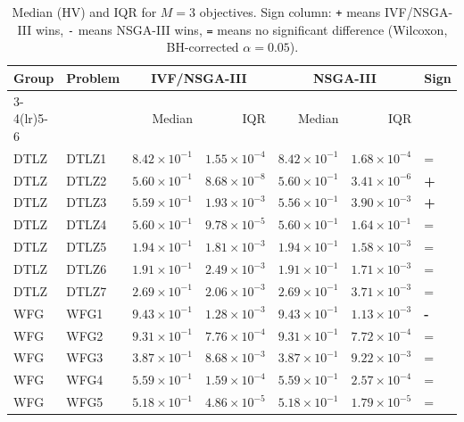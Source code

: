 \begin{table}[t]
\centering
\caption{Median (HV) and IQR for $M=3$ objectives. Sign column: \texttt{+} means IVF/NSGA-III wins, \texttt{-} means NSGA-III wins, \texttt{=} means no significant difference (Wilcoxon, BH-corrected $\alpha=0.05$).}
\label{tab:hv_m3_ivfnsgaiii}
\scriptsize
\begin{tabular}{llrrrrl}
\toprule
Group & Problem & \multicolumn{2}{c}{IVF/NSGA-III} & \multicolumn{2}{c}{NSGA-III} & Sign \\
\cmidrule(lr){3-4}\cmidrule(lr){5-6}
 & & Median & IQR & Median & IQR & \\
\midrule
DTLZ & DTLZ1 & $8.42\!\times\!10^{-1}$ & $1.55\!\times\!10^{-4}$ & $8.42\!\times\!10^{-1}$ & $1.68\!\times\!10^{-4}$ & = \\
DTLZ & DTLZ2 & $5.60\!\times\!10^{-1}$ & $8.68\!\times\!10^{-8}$ & $5.60\!\times\!10^{-1}$ & $3.41\!\times\!10^{-6}$ & \textbf{+} \\
DTLZ & DTLZ3 & $5.59\!\times\!10^{-1}$ & $1.93\!\times\!10^{-3}$ & $5.56\!\times\!10^{-1}$ & $3.90\!\times\!10^{-3}$ & \textbf{+} \\
DTLZ & DTLZ4 & $5.60\!\times\!10^{-1}$ & $9.78\!\times\!10^{-5}$ & $5.60\!\times\!10^{-1}$ & $1.64\!\times\!10^{-1}$ & = \\
DTLZ & DTLZ5 & $1.94\!\times\!10^{-1}$ & $1.81\!\times\!10^{-3}$ & $1.94\!\times\!10^{-1}$ & $1.58\!\times\!10^{-3}$ & = \\
DTLZ & DTLZ6 & $1.91\!\times\!10^{-1}$ & $2.49\!\times\!10^{-3}$ & $1.91\!\times\!10^{-1}$ & $1.71\!\times\!10^{-3}$ & = \\
DTLZ & DTLZ7 & $2.69\!\times\!10^{-1}$ & $2.06\!\times\!10^{-3}$ & $2.69\!\times\!10^{-1}$ & $3.71\!\times\!10^{-3}$ & = \\
\addlinespace
WFG & WFG1 & $9.43\!\times\!10^{-1}$ & $1.28\!\times\!10^{-3}$ & $9.43\!\times\!10^{-1}$ & $1.13\!\times\!10^{-3}$ & \textbf{-} \\
WFG & WFG2 & $9.31\!\times\!10^{-1}$ & $7.76\!\times\!10^{-4}$ & $9.31\!\times\!10^{-1}$ & $7.72\!\times\!10^{-4}$ & = \\
WFG & WFG3 & $3.87\!\times\!10^{-1}$ & $8.68\!\times\!10^{-3}$ & $3.87\!\times\!10^{-1}$ & $9.22\!\times\!10^{-3}$ & = \\
WFG & WFG4 & $5.59\!\times\!10^{-1}$ & $1.59\!\times\!10^{-4}$ & $5.59\!\times\!10^{-1}$ & $2.57\!\times\!10^{-4}$ & = \\
WFG & WFG5 & $5.18\!\times\!10^{-1}$ & $4.86\!\times\!10^{-5}$ & $5.18\!\times\!10^{-1}$ & $1.79\!\times\!10^{-5}$ & = \\

\end{tabular}
\end{table}
